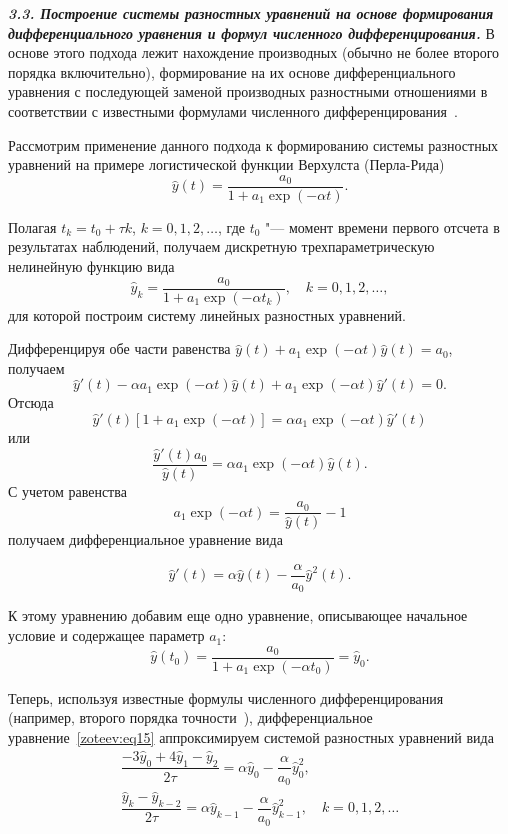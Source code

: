 {\bf \itshape 3.3. Построение системы разностных уравнений на основе формирования дифференциального уравнения и формул численного \linebreak дифференцирования.}
В основе этого подхода лежит нахождение производных (обычно не более второго порядка включительно), формирование на их основе дифференциального уравнения с последующей заменой производных разностными отношениями в соответствии с известными формулами численного дифференцирования~\cite{zot:10,zot:14}.

Рассмотрим применение данного подхода к формированию системы разностных уравнений на примере логистической функции Верхулста (Перла-Рида)~\cite{zot:15,zot:16,zot:17}
$$
\hat{y}(t)=\dfrac{a_0}{1+a_1\exp(-\alpha t)}.$$

Полагая $t_k=t_0+\tau k$, $k=0,1,2,\dots$, где $t_0$ "--- момент времени первого отсчета в результатах наблюдений, получаем дискретную трехпараметрическую нелинейную функцию вида
\begin{equation}
\hat{y}_k=\dfrac{a_0}{1+a_1\exp(-\alpha t_k)}, \quad k=0,1,2,\dots,
\label{zoteev:eq14}
\end{equation}
для которой построим систему линейных разностных уравнений.

Дифференцируя обе части равенства $\hat{y}(t)+a_1\exp(-\alpha t)\hat{y}(t)=a_0$, получаем
$$
\hat{y}'(t)-\alpha a_1\exp(-\alpha t)\hat{y}(t)+a_1\exp(-\alpha t)\hat{y}'(t)=0.
$$ 
Отсюда 
$$\hat{y}'(t)[1+a_1\exp(-\alpha t)]=\alpha a_1\exp(-\alpha t)\hat{y}'(t)$$ 
или 
$$\dfrac{\hat{y}'(t)a_0}{\hat{y}(t)}=\alpha a_1\exp(-\alpha t)\hat{y}(t).$$
С учетом равенства 
$$
a_1\exp(-\alpha t)=\frac{a_0}{\hat{y}(t)}-1
$$ 
получаем дифференциальное уравнение вида

\begin{equation}
\hat{y}'(t)=\alpha\hat{y}(t)-\dfrac{\alpha}{a_0}\hat{y}^{2}(t).
\label{zoteev:eq15}
\end{equation}

К этому уравнению добавим еще одно уравнение, описывающее начальное условие и содержащее параметр $a_1$: 
$$
\hat{y}(t_0)=\dfrac{a_0}{1+a_1\exp(-\alpha t_0)}=\hat{y}_0.
$$

Теперь, используя известные формулы численного дифференцирования (например, второго порядка точности~\cite{zot:14}), дифференциальное уравнение~\eqref{zoteev:eq15} аппроксимируем системой разностных уравнений вида
$$
\begin{array}{ll}
\dfrac{-3\hat{y}_0+4\hat{y}_1-\hat{y}_2}{2\tau}=\alpha\hat{y}_0-\dfrac{\alpha}{a_0}\hat{y}_0^2, & \\[2mm] \dfrac{\hat{y}_k-\hat{y}_{k-2}}{2\tau}=\alpha\hat{y}_{k-1}-\dfrac{\alpha}{a_0}\hat{y}_{k-1}^2, & k=0,1,2,\dots
\end{array}
$$

